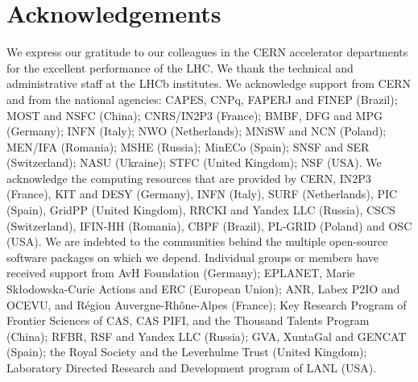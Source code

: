 \section*{Acknowledgements}
%
%
\noindent We express our gratitude to our colleagues in the CERN
accelerator departments for the excellent performance of the LHC. We
thank the technical and administrative staff at the LHCb
institutes.
We acknowledge support from CERN and from the national agencies:
CAPES, CNPq, FAPERJ and FINEP (Brazil); 
MOST and NSFC (China); 
CNRS/IN2P3 (France); 
BMBF, DFG and MPG (Germany); 
INFN (Italy); 
NWO (Netherlands); 
MNiSW and NCN (Poland); 
MEN/IFA (Romania); 
MSHE (Russia); 
MinECo (Spain); 
SNSF and SER (Switzerland); 
NASU (Ukraine); 
STFC (United Kingdom); 
NSF (USA).
We acknowledge the computing resources that are provided by CERN, IN2P3
(France), KIT and DESY (Germany), INFN (Italy), SURF (Netherlands),
PIC (Spain), GridPP (United Kingdom), RRCKI and Yandex
LLC (Russia), CSCS (Switzerland), IFIN-HH (Romania), CBPF (Brazil),
PL-GRID (Poland) and OSC (USA).
We are indebted to the communities behind the multiple open-source
software packages on which we depend.
Individual groups or members have received support from
AvH Foundation (Germany);
EPLANET, Marie Sk\l{}odowska-Curie Actions and ERC (European Union);
ANR, Labex P2IO and OCEVU, and R\'{e}gion Auvergne-Rh\^{o}ne-Alpes (France);
Key Research Program of Frontier Sciences of CAS, CAS PIFI, and the Thousand Talents Program (China);
RFBR, RSF and Yandex LLC (Russia);
GVA, XuntaGal and GENCAT (Spain);
the Royal Society
and the Leverhulme Trust (United Kingdom);
Laboratory Directed Research and Development program of LANL (USA).
